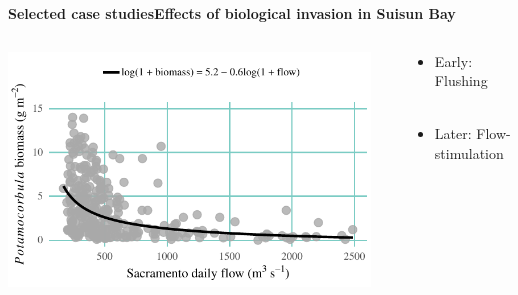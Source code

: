 \documentclass[serif]{beamer}\usepackage[]{graphicx}\usepackage[]{color}
\begin{document}
\begin{frame}{\textbf{Selected case studies}}{\textbf{Effects of biological invasion in Suisun Bay}}
\begin{columns}
\begin{column}{0.5\textwidth}
\centerline{\includegraphics[width = 0.95\textwidth, page = 3]{fig/d7flos.pdf}}
\end{column}
\begin{column}{0.5\textwidth}
\begin{itemize}
\item Early: Flushing \\~\\
\item Later: Flow-stimulation
\end{itemize}
\end{column}
\end{columns}
\begin{columns}
\begin{column}{0.5\textwidth}
\end{column}
\end{columns}
\end{frame}
\end{document}
